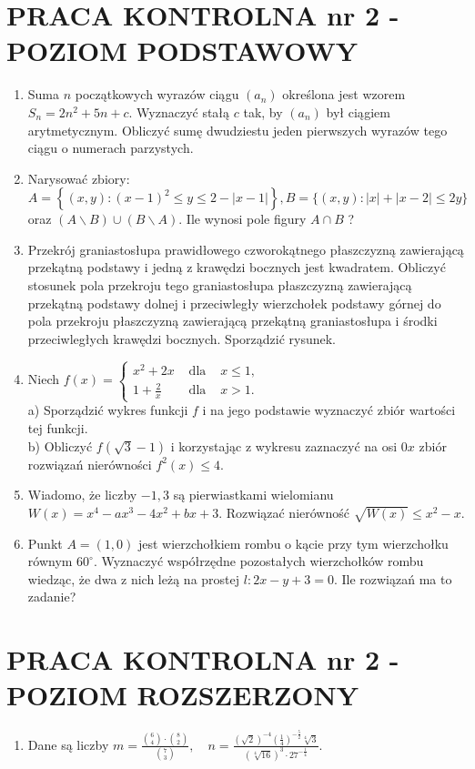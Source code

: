 \documentclass[10pt]{article}
\begin{document}
\section*{PRACA KONTROLNA nr 2 - POZIOM PODSTAWOWY}
\begin{enumerate}
  \item Suma $n$ początkowych wyrazów ciągu $\left(a_{n}\right)$ określona jest wzorem $S_{n}=2 n^{2}+5 n+c$. Wyznaczyć stałą $c$ tak, by $\left(a_{n}\right)$ był ciągiem arytmetycznym. Obliczyć sumę dwudziestu jeden pierwszych wyrazów tego ciągu o numerach parzystych.
  \item Narysować zbiory: $A=\left\{(x, y):(x-1)^{2} \leqslant y \leqslant 2-|x-1|\right\}, B=\{(x, y):|x|+|x-2| \leqslant 2 y\}$ oraz $(A \backslash B) \cup(B \backslash A)$. Ile wynosi pole figury $A \cap B$ ?
  \item Przekrój graniastosłupa prawidłowego czworokątnego płaszczyzną zawierającą przekątną podstawy i jedną z krawędzi bocznych jest kwadratem. Obliczyć stosunek pola przekroju tego graniastosłupa płaszczyzną zawierającą przekątną podstawy dolnej i przeciwległy wierzchołek podstawy górnej do pola przekroju płaszczyzną zawierającą przekątną graniastosłupa i środki przeciwległych krawędzi bocznych. Sporządzić rysunek.
  \item Niech $f(x)=\left\{\begin{array}{lll}x^{2}+2 x & \text { dla } & x \leqslant 1, \\ 1+\frac{2}{x} & \text { dla } & x>1 .\end{array}\right.$\\
a) Sporządzić wykres funkcji $f$ i na jego podstawie wyznaczyć zbiór wartości tej funkcji.\\
b) Obliczyć $f(\sqrt{3}-1)$ i korzystając z wykresu zaznaczyć na osi $0 x$ zbiór rozwiązań nierówności $f^{2}(x) \leqslant 4$.
  \item Wiadomo, że liczby $-1,3$ są pierwiastkami wielomianu $W(x)=x^{4}-a x^{3}-4 x^{2}+b x+3$. Rozwiązać nierówność $\sqrt{W(x)} \leqslant x^{2}-x$.
  \item Punkt $A=(1,0)$ jest wierzchołkiem rombu o kącie przy tym wierzchołku równym $60^{\circ}$. Wyznaczyć współrzędne pozostałych wierzchołków rombu wiedząc, że dwa z nich leżą na prostej $l: 2 x-y+3=0$. Ile rozwiązań ma to zadanie?
\end{enumerate}

\section*{PRACA KONTROLNA nr 2 - POZIOM ROZSZERZONY}
\begin{enumerate}
  \item Dane są liczby $m=\frac{\binom{6}{4} \cdot\binom{8}{2}}{\binom{7}{3}}, \quad n=\frac{(\sqrt{2})^{-4}\left(\frac{1}{4}\right)^{-\frac{5}{2}} \sqrt[4]{3}}{(\sqrt[4]{16})^{3} \cdot 27^{-\frac{1}{4}}}$.
\end{enumerate}
\end{document}
